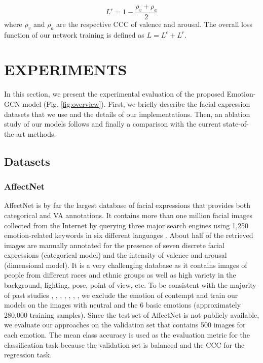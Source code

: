 \documentclass[a4paper, 10pt, conference]{ieeeconf}      \usepackage{FG2021}
\begin{document}
\begin{equation}
    L^{r} = 1 - \frac{\rho_v + \rho_a}{2}
    \label{eqn:ccc}
\end{equation}
where $\rho_v$ and $\rho_a$ are the respective CCC of valence and arousal. The overall loss function of our network training is defined as $L = L^{c} + L^{r}$.

\section{EXPERIMENTS}
\label{sec:experiments}

In this section, we present the experimental evaluation of the proposed Emotion-GCN model (Fig. \ref{fig:overview}). First, we briefly describe the facial expression datasets that we use and the details of our implementations. Then, an ablation study of our models follows and finally a comparison with the current state-of-the-art methods.

\subsection{Datasets}

\subsubsection{AffectNet} AffectNet is by far the largest database of facial expressions that provides both categorical and VA annotations. It contains more than one million facial images collected from the Internet by querying three major search engines using 1,250 emotion-related keywords in six different languages \cite{mollahosseini2017affectnet}. About half of the retrieved images are manually annotated for the presence of seven discrete facial expressions (categorical model) and the intensity of valence and arousal (dimensional model). It is a very challenging database as it contains images of people from different races and ethnic groups as well as high variety in the background, lighting, pose, point of view, etc. To be consistent with the majority of past studies \cite{zeng2018facial}, \cite{li2018occlusion}, \cite{chen2019facial}, \cite{kervadec2018cake}, \cite{ding2020occlusion}, \cite{georgescu2019local}, \cite{hayale2019facial}, we exclude the emotion of contempt and train our models on the images with neutral and the 6 basic emotions (approximately 280,000 training samples). Since the test set of AffectNet is not publicly available, we evaluate our approaches on the validation set that contains 500 images for each emotion. The mean class accuracy is used as the evaluation metric for the classification task because the validation set is balanced and the CCC for the regression task.
\end{document}
